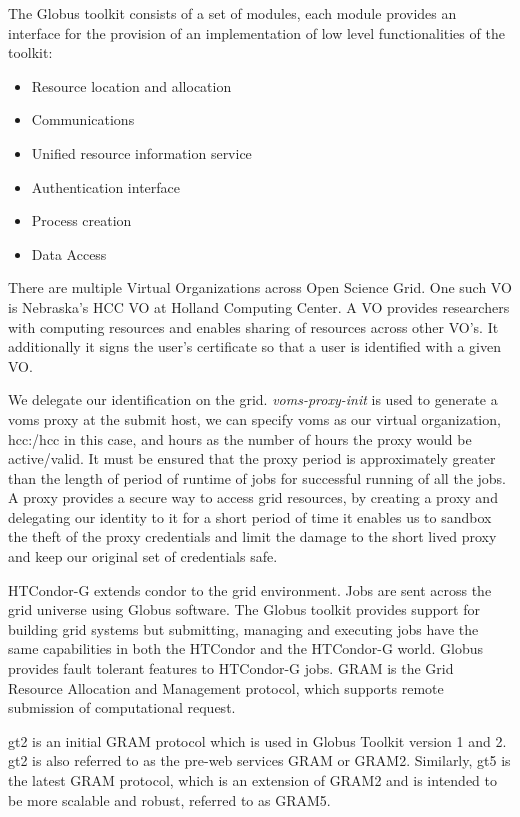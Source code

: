 \documentclass[ms,electronic,double]{nuthesis}
\begin{document}
The Globus toolkit consists of a set of modules,  each module provides an 
interface for the provision of an implementation of low level functionalities of the toolkit:

\begin{itemize}
  \item{Resource location and allocation} 
  \item{Communications}
  \item{Unified resource information service}
  \item{Authentication interface}
  \item{Process creation}
  \item{Data Access}
\end{itemize}

There are multiple Virtual Organizations across Open Science Grid. One such VO 
is Nebraska's HCC VO at Holland Computing Center. A VO provides researchers with 
computing resources and enables sharing of resources across other VO's. It additionally it signs the user's certificate so that a user is identified with a given VO.

We delegate our identification on the grid. \emph{voms-proxy-init}
is used to generate a voms proxy at the submit host, we can specify voms as our 
virtual organization, hcc:/hcc in this case, and hours as the number of hours the proxy would be 
active/valid. It must be ensured that the proxy period is approximately greater than the 
length of period of runtime of jobs for successful running of all the jobs. A 
proxy provides a secure way to access grid resources, by creating a proxy and 
delegating our identity to it for a short period of time it enables us to sandbox 
the theft of the proxy credentials and limit the damage to the short lived proxy 
and keep our original set of credentials safe.

HTCondor-G extends condor to the grid environment. Jobs are sent across the grid universe using 
Globus software. The Globus toolkit provides support for building grid systems but 
submitting, managing and executing jobs have the same capabilities in both the HTCondor 
and the HTCondor-G world. Globus provides fault tolerant features to HTCondor-G 
jobs. GRAM is the Grid Resource Allocation and Management protocol, which supports remote 
submission of computational request.

gt2 is an initial GRAM protocol which is used in Globus Toolkit version 1 and 
2. gt2 is also referred to as the pre-web services GRAM or GRAM2. Similarly, gt5 is the latest GRAM protocol, which is an extension of GRAM2 and is intended 
to be more scalable and robust, referred to as GRAM5.
\end{document}
